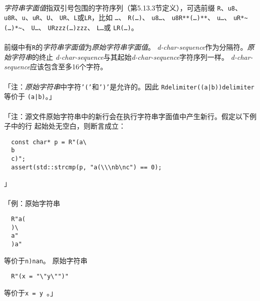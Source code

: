 \paragraph{}
\textit{字符串字面值}指双引号包围的字符序列（第5.13.3节定义），可选前缀
\texttt{R}、\texttt{u8}、\texttt{u8R}、\texttt{u}、\texttt{uR}、\texttt{U}、
\texttt{UR}、\texttt{L}或\texttt{LR}，比如
\texttt{\dq{}\ldots\dq}、
\texttt{R\dq{}(\ldots)\dq}、
\texttt{u8\dq{}\ldots\dq}、
\texttt{u8R\dq{}**(\ldots)**\dq}、
\texttt{u\dq{}\ldots\dq}、
\texttt{uR\dq{}*\textasciitilde(\ldots)*\textasciitilde\dq}、
\texttt{U\dq{}\ldots\dq}、
\texttt{UR\dq{}zzz(\ldots)zzz\dq}、
\texttt{L\dq{}\ldots\dq}或
\texttt{LR\dq{}(\ldots)\dq}。

\paragraph{}
前缀中有\texttt{R}的\textit{字符串字面值}为\textit{原始字符串字面值}。
\textit{d-char-sequence}作为分隔符。\textit{原始字符串}的终止
\textit{d-char-sequence}与其起始\textit{d-char-sequence}字符序列一样。
\textit{d-char-sequence}应该包含至多16个字符。

\paragraph{}
「注：\textit{原始字符串}中字符\texttt{'('}和\texttt{')'}是允许的。因此
\texttt{R\dq{}delimiter((a|b))delimiter\dq}等价于
\texttt{\dq{}(a|b)\dq}。」

\paragraph{}
「注：源文件原始字符串中的新行会在执行字符串字面值中产生新行。假定以下例子中的行
起始处无空白，则断言成立：
\begin{lstlisting}
  const char* p = R"(a\
  b
  c)";
  assert(std::strcmp(p, "a(\\\nb\nc") == 0);
\end{lstlisting}」

\paragraph{}
「例：原始字符串
\begin{lstlisting}
  R"a(
  )\
  a"
  )a"
\end{lstlisting}
等价于\texttt{\dq\bs n)\bs\bs\bs na\bs\dq\bs n\dq}。
原始字符串
\begin{lstlisting}
  R"(x = "\"y\"")"
\end{lstlisting}
等价于\texttt{\dq x = \bs\dq\bs\bs\bs\dq y\bs\bs\bs\dq
\bs\dq\dq}。」

